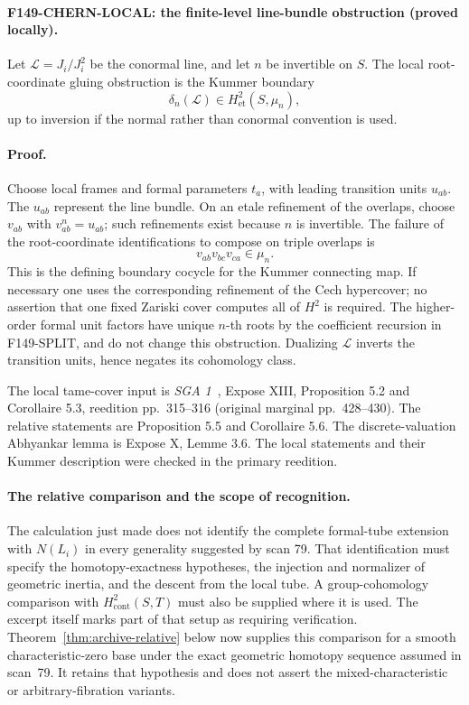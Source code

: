 \documentclass[11pt,a4paper]{article}
\theoremstyle{definition}
\begin{document}
\paragraph{F149-CHERN-LOCAL: the finite-level line-bundle obstruction
(proved locally).}
Let \(\mathcal L=J_i/J_i^2\) be the conormal line, and let \(n\) be
invertible on \(S\).  The local root-coordinate gluing obstruction is
the Kummer boundary
\[
 \delta_n(\mathcal L)\in H^2_{\mathrm{et}}(S,\mu_n),
\]
up to inversion if the normal rather than conormal convention is used.

\paragraph{Proof.}
Choose local frames and formal parameters \(t_a\), with leading
transition units \(u_{ab}\).  The \(u_{ab}\) represent the line bundle.
On an etale refinement of the overlaps, choose
\(v_{ab}\) with \(v_{ab}^n=u_{ab}\); such refinements exist because
\(n\) is invertible.  The failure of the root-coordinate identifications
to compose on triple overlaps is
\[
 v_{ab}v_{bc}v_{ca}\in\mu_n.
\]
This is the defining boundary cocycle for the Kummer connecting map.
If necessary one uses the corresponding refinement of the Cech
hypercover; no assertion that one fixed Zariski cover computes all of
\(H^2\) is required.  The higher-order formal unit factors have unique
\(n\)-th roots by the coefficient recursion in F149-SPLIT, and do not
change this obstruction.  Dualizing \(\mathcal L\) inverts the
transition units, hence negates its cohomology class.

The local tame-cover input is \emph{SGA 1}~\cite{SGA1}, Expose XIII,
Proposition 5.2 and Corollaire 5.3, reedition pp.~315--316
(original marginal pp.~428--430).  The relative statements are
Proposition 5.5 and Corollaire 5.6.  The discrete-valuation
Abhyankar lemma is Expose X, Lemme 3.6.  The local statements and
their Kummer description were checked in the primary reedition.

\paragraph{The relative comparison and the scope of recognition.}
The calculation just made does not identify the complete formal-tube
extension with \(N(L_i)\) in every generality suggested by scan 79.
That identification must specify the homotopy-exactness hypotheses,
the injection and normalizer of geometric inertia, and the descent
from the local tube.  A group-cohomology comparison with
\(H^2_{\mathrm{cont}}(S,T)\) must also be supplied where it is used.
The excerpt itself marks part of that setup as requiring verification.
Theorem~\ref{thm:archive-relative} below now supplies this comparison for a smooth characteristic-zero base under the exact geometric homotopy sequence assumed in scan~79. It retains that hypothesis and does not assert the mixed-characteristic or arbitrary-fibration variants.
\end{document}

